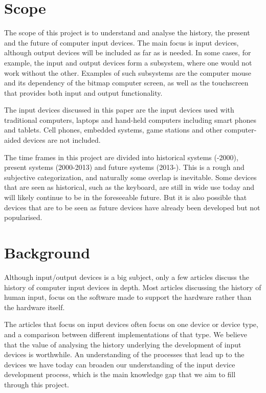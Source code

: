 \documentclass[a4paper,10pt]{article}
\begin{document}
\section{Scope}

The scope of this project is to understand and analyse the history, the present and the future of computer input devices. The main focus is input devices, although output devices will be included as far as is needed. In some cases, for example, the input and output devices form a subsystem, where one would not work without the other. Examples of such subsystems are the computer mouse and its dependency of the bitmap computer screen, as well as the touchscreen that provides both input and output functionality. 

The input devices discussed in this paper are the input devices used with traditional computers, laptops and hand-held computers including smart phones and tablets. Cell phones, embedded systems, game stations and other computer-aided devices are not included.

The time frames in this project are divided into historical systems (-2000), present systems (2000-2013) and future systems (2013-). This is a rough and subjective categorization, and naturally some overlap is inevitable. Some devices that are seen as historical, such as the keyboard, are still in wide use today and will likely continue to be in the foreseeable future. But it is also possible that devices that are to be seen as future devices have already been developed but not popularised.

\section{Background}
Although input/output devices is a big subject, only a few articles discuss the history of computer input devices in depth\cite{myers}\cite{aspray}. Most articles discussing the history of human input, focus on the software made to support the hardware rather than the hardware itself\cite{facial}.

The articles that focus on input devices often focus on one device or device type, and a comparison between different implementations of that type. We believe that the value of analysing the history underlying the development of input devices is worthwhile. An understanding of the processes that lead up to the devices we have today can broaden our understanding of the input device development process, which is the main knowledge gap that we aim to fill through this project.
\end{document}
